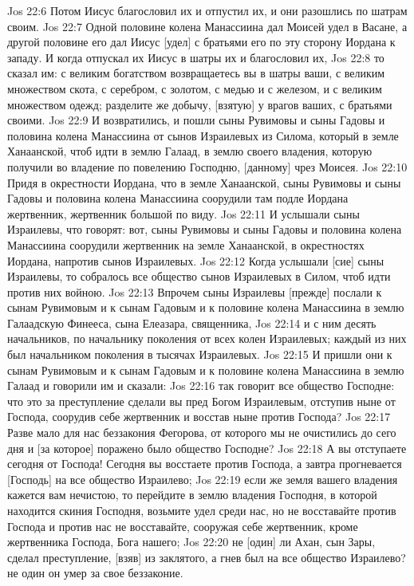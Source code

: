 Jos 22:6  Потом Иисус благословил их и отпустил их, и они разошлись по шатрам своим.
Jos 22:7  Одной половине колена Манассиина дал Моисей удел в Васане, а другой половине его дал Иисус [удел] с братьями его по эту сторону Иордана к западу. И когда отпускал их Иисус в шатры их и благословил их,
Jos 22:8  то сказал им: с великим богатством возвращаетесь вы в шатры ваши, с великим множеством скота, с серебром, с золотом, с медью и с железом, и с великим множеством одежд; разделите же добычу, [взятую] у врагов ваших, с братьями своими.
Jos 22:9  И возвратились, и пошли сыны Рувимовы и сыны Гадовы и половина колена Манассиина от сынов Израилевых из Силома, который в земле Ханаанской, чтоб идти в землю Галаад, в землю своего владения, которую получили во владение по повелению Господню, [данному] чрез Моисея.
Jos 22:10  Придя в окрестности Иордана, что в земле Ханаанской, сыны Рувимовы и сыны Гадовы и половина колена Манассиина соорудили там подле Иордана жертвенник, жертвенник большой по виду.
Jos 22:11  И услышали сыны Израилевы, что говорят: вот, сыны Рувимовы и сыны Гадовы и половина колена Манассиина соорудили жертвенник на земле Ханаанской, в окрестностях Иордана, напротив сынов Израилевых.
Jos 22:12  Когда услышали [сие] сыны Израилевы, то собралось все общество сынов Израилевых в Силом, чтоб идти против них войною.
Jos 22:13  Впрочем сыны Израилевы [прежде] послали к сынам Рувимовым и к сынам Гадовым и к половине колена Манассиина в землю Галаадскую Финееса, сына Елеазара, священника,
Jos 22:14  и с ним десять начальников, по начальнику поколения от всех колен Израилевых; каждый из них был начальником поколения в тысячах Израилевых.
Jos 22:15  И пришли они к сынам Рувимовым и к сынам Гадовым и к половине колена Манассиина в землю Галаад и говорили им и сказали:
Jos 22:16  так говорит все общество Господне: что это за преступление сделали вы пред Богом Израилевым, отступив ныне от Господа, соорудив себе жертвенник и восстав ныне против Господа?
Jos 22:17  Разве мало для нас беззакония Фегорова, от которого мы не очистились до сего дня и [за которое] поражено было общество Господне?
Jos 22:18  А вы отступаете сегодня от Господа! Сегодня вы восстаете против Господа, а завтра прогневается [Господь] на все общество Израилево;
Jos 22:19  если же земля вашего владения кажется вам нечистою, то перейдите в землю владения Господня, в которой находится скиния Господня, возьмите удел среди нас, но не восставайте против Господа и против нас не восставайте, сооружая себе жертвенник, кроме жертвенника Господа, Бога нашего;
Jos 22:20  не [один] ли Ахан, сын Зары, сделал преступление, [взяв] из заклятого, а гнев был на все общество Израилево? не один он умер за свое беззаконие.
